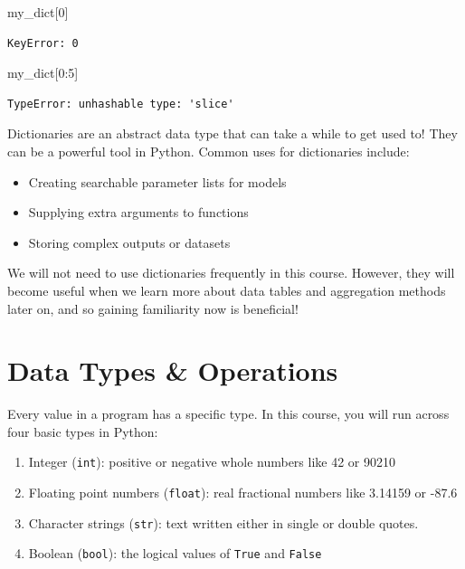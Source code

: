 \documentclass[
  letterpaper,
  DIV=11,
  numbers=noendperiod]{scrreprt}
\newenvironment{Shaded}{\begin{snugshade}}{\end{snugshade}}
\newcommand{\DecValTok}[1]{\textcolor[rgb]{0.68,0.00,0.00}{#1}}
\newcommand{\NormalTok}[1]{\textcolor[rgb]{0.00,0.23,0.31}{#1}}
\providecommand{\tightlist}{%
  \setlength{\itemsep}{0pt}\setlength{\parskip}{0pt}}\usepackage{longtable,booktabs,array}
\begin{document}
\begin{Shaded}
\begin{Highlighting}[]
\NormalTok{my\_dict[}\DecValTok{0}\NormalTok{]}
\end{Highlighting}
\end{Shaded}

\begin{verbatim}
KeyError: 0
\end{verbatim}

\begin{Shaded}
\begin{Highlighting}[]
\NormalTok{my\_dict[}\DecValTok{0}\NormalTok{:}\DecValTok{5}\NormalTok{]}
\end{Highlighting}
\end{Shaded}

\begin{verbatim}
TypeError: unhashable type: 'slice'
\end{verbatim}

Dictionaries are an abstract data type that can take a while to get used
to! They can be a powerful tool in Python. Common uses for dictionaries
include:

\begin{itemize}
\tightlist
\item
  Creating searchable parameter lists for models
\item
  Supplying extra arguments to functions
\item
  Storing complex outputs or datasets
\end{itemize}

We will not need to use dictionaries frequently in this course. However,
they will become useful when we learn more about data tables and
aggregation methods later on, and so gaining familiarity now is
beneficial!

\hypertarget{data-types-operations}{%
\section{Data Types \& Operations}\label{data-types-operations}}

Every value in a program has a specific type. In this course, you will
run across four basic types in Python:

\begin{enumerate}
\def\labelenumi{\arabic{enumi}.}
\tightlist
\item
  Integer (\texttt{int}): positive or negative whole numbers like 42 or
  90210
\item
  Floating point numbers (\texttt{float}): real fractional numbers like
  3.14159 or -87.6
\item
  Character strings (\texttt{str}): text written either in single or
  double quotes.
\item
  Boolean (\texttt{bool}): the logical values of \texttt{True} and
  \texttt{False}
\end{enumerate}
\end{document}
